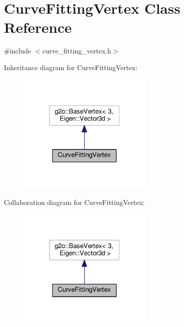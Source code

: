 \hypertarget{classCurveFittingVertex}{}\section{Curve\+Fitting\+Vertex Class Reference}
\label{classCurveFittingVertex}


{\ttfamily \#include $<$curve\+\_\+fitting\+\_\+vertex.\+h$>$}



Inheritance diagram for Curve\+Fitting\+Vertex\+:\nopagebreak
\begin{figure}[H]
\begin{center}
\leavevmode
\includegraphics[width=187pt]{classCurveFittingVertex__inherit__graph}
\end{center}
\end{figure}


Collaboration diagram for Curve\+Fitting\+Vertex\+:\nopagebreak
\begin{figure}[H]
\begin{center}
\leavevmode
\includegraphics[width=187pt]{classCurveFittingVertex__coll__graph}
\end{center}
\end{figure}
